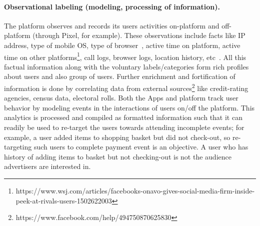 \documentclass[a4paper,twoside]{article}
\begin{document}
\paragraph{Observational labeling (modeling, processing of information).}
The platform observes and records its users activities on-platform and
off-platform (through Pixel, for example). These observations include
facts like IP address, type of mobile OS, type of
browser~\cite{fb-browser-extension-detection}, active time on
platform, active time on other
platforms\footnote{https://www.wsj.com/articles/facebooks-onavo-gives-social-media-firm-inside-peek-at-rivals-users-1502622003},
call logs, browser logs, location history,
etc~\cite{big-brother-watching}. All this factual information along
with the voluntary labels/categories form rich profiles about users
and also group of users. Further enrichment and fortification of
information is done by correlating data from external
sources\footnote{https://www.facebook.com/help/494750870625830} like
credit-rating agencies, census data, electoral rolls. Both the Apps
and platform track user behavior by modeling events in the
interactions of users on/off the platform. This analytics is processed
and compiled as formatted information such that it can readily be used
to re-target the users towards attending incomplete events; for
example, a user added items to shopping basket but did not check-out,
so re-targeting such users to complete payment event is an objective. A
user who has history of adding items to basket but not checking-out is
not the audience advertisers are interested in.

\end{document}
